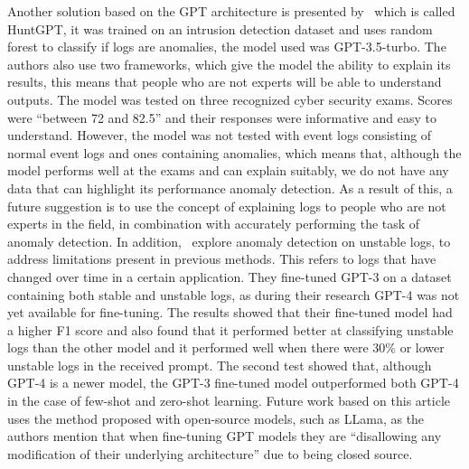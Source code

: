 Another solution based on the GPT architecture is presented by~\cite{ali2023huntgpt} which is called HuntGPT, it was trained on an intrusion detection dataset and uses random forest to classify if logs are anomalies, the model used was GPT-3.5-turbo. The authors also use two frameworks, which give the model the ability to explain its results, this means that people who are not experts will be able to understand outputs. The model was tested on three recognized cyber security exams. Scores were ``between 72 and 82.5'' and their responses were informative and easy to understand. However, the model was not tested with event logs consisting of normal event logs and ones containing anomalies, which means that, although the model performs well at the exams and can explain suitably, we do not have any data that can highlight its performance anomaly detection. As a result of this, a future suggestion is to use the concept of explaining logs to people who are not experts in the field, in combination with accurately performing the task of anomaly detection. In addition,~\cite{hadadi2024anomaly} explore anomaly detection on unstable logs, to address limitations present in previous methods. This refers to logs that have changed over time in a certain application. They fine-tuned GPT-3 on a dataset containing both stable and unstable logs, as during their research GPT-4 was not yet available for fine-tuning. The results showed that their fine-tuned model had a higher F1 score and also found that it performed better at classifying unstable logs than the other model and it performed well when there were 30\% or lower unstable logs in the received prompt. The second test showed that, although GPT-4 is a newer model, the GPT-3 fine-tuned model outperformed both GPT-4 in the case of few-shot and zero-shot learning. Future work based on this article uses the method proposed with open-source models, such as LLama, as the authors mention that when fine-tuning GPT models they are ``disallowing any modification of their underlying architecture'' due to being closed source.

